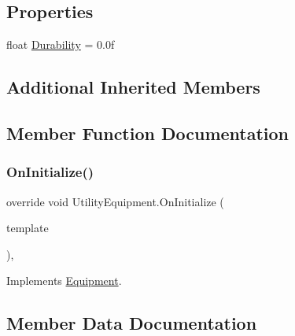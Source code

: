 \subsection*{Properties}
\begin{DoxyCompactItemize}
\item 
float \mbox{\hyperlink{class_utility_equipment_ab8a11f2ff0193732a786c1b18f7ec549}{Durability}} = 0.\+0f
\end{DoxyCompactItemize}
\subsection*{Additional Inherited Members}


\subsection{Member Function Documentation}
\mbox{\label{class_utility_equipment_a1b8bbcd0b373613156c289e68fcc3a99}} 
\subsubsection{\texorpdfstring{On\+Initialize()}{OnInitialize()}}
{\footnotesize\ttfamily override void Utility\+Equipment.\+On\+Initialize (\begin{DoxyParamCaption}\item[{\mbox{\hyperlink{class_equipment_template}{Equipment\+Template}}}]{template }\end{DoxyParamCaption})\hspace{0.3cm}{\ttfamily [protected]}, {\ttfamily [virtual]}}



Implements \mbox{\hyperlink{class_equipment_ae9932146aba24d5a614d1eb8ab415e10}{Equipment}}.



\subsection{Member Data Documentation}
\mbox{\label{class_utility_equipment_ac7962945d343430b5b3177d2f518e66d}} 
